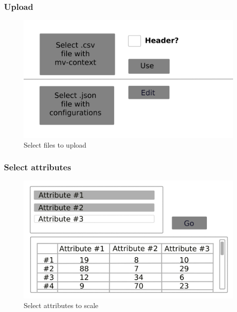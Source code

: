 \documentclass[]{beamer}
\begin{document}
	\begin{frame}
		\frametitle{Upload}
		\begin{figure}[H]
			\includegraphics[width=\linewidth]{../mock_up/panel-1.png}
			\caption{Select files to upload}
			\label{fig:p1}
		\end{figure}
	\end{frame}

	\begin{frame}
		\frametitle{Select attributes}
		\begin{figure}[H]
			\includegraphics[width=\linewidth]{../mock_up/panel-2.png}
			\caption{Select attributes to scale}
			\label{fig:p1}
		\end{figure}
	\end{frame}
\end{document}
